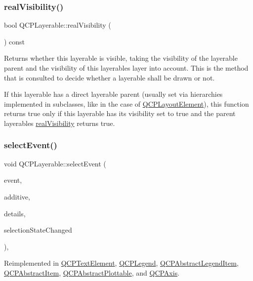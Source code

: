 \subsubsection{\texorpdfstring{realVisibility()}{realVisibility()}}
{\footnotesize\ttfamily bool Q\+C\+P\+Layerable\+::real\+Visibility (\begin{DoxyParamCaption}{ }\end{DoxyParamCaption}) const}

Returns whether this layerable is visible, taking the visibility of the layerable parent and the visibility of this layerable\textquotesingle{}s layer into account. This is the method that is consulted to decide whether a layerable shall be drawn or not.

If this layerable has a direct layerable parent (usually set via hierarchies implemented in subclasses, like in the case of \mbox{\hyperlink{class_q_c_p_layout_element}{Q\+C\+P\+Layout\+Element}}), this function returns true only if this layerable has its visibility set to true and the parent layerable\textquotesingle{}s \mbox{\hyperlink{class_q_c_p_layerable_ab054e88f15d485defcb95e7376f119e7}{real\+Visibility}} returns true. \mbox{\label{class_q_c_p_layerable_a7498c2d0d081cf7cad0fb3bb93aa0e91}} 
\subsubsection{\texorpdfstring{selectEvent()}{selectEvent()}}
{\footnotesize\ttfamily void Q\+C\+P\+Layerable\+::select\+Event (\begin{DoxyParamCaption}\item[{Q\+Mouse\+Event $\ast$}]{event,  }\item[{bool}]{additive,  }\item[{const Q\+Variant \&}]{details,  }\item[{bool $\ast$}]{selection\+State\+Changed }\end{DoxyParamCaption})\hspace{0.3cm}{\ttfamily [protected]}, {\ttfamily [virtual]}}



Reimplemented in \mbox{\hyperlink{class_q_c_p_text_element_a8d696ea82fa7bf743e01858039c03525}{Q\+C\+P\+Text\+Element}}, \mbox{\hyperlink{class_q_c_p_legend_a71f54a05c3e5b1a1ade1864422cd642e}{Q\+C\+P\+Legend}}, \mbox{\hyperlink{class_q_c_p_abstract_legend_item_a0081acfd8c4bb8ac4e9dcfe0f6c49b74}{Q\+C\+P\+Abstract\+Legend\+Item}}, \mbox{\hyperlink{class_q_c_p_abstract_item_aa4b969c58797f39c9c0b6c07c7869d17}{Q\+C\+P\+Abstract\+Item}}, \mbox{\hyperlink{class_q_c_p_abstract_plottable_a2d488568cf16600dd81fa23d7d439829}{Q\+C\+P\+Abstract\+Plottable}}, and \mbox{\hyperlink{class_q_c_p_axis_a50c3ed18e189d48421ec2978f88e4f87}{Q\+C\+P\+Axis}}.

